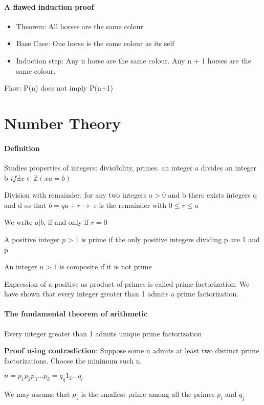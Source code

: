 \documentclass[9pt, letterpaper, oneside]{article}
\begin{document}
\paragraph{A flawed induction proof}
\begin{itemize}
	\item Theorem: All horses are the same colour
	\item Base Case: One horse is the same colour as its self
	\item Induction step: Any n horse are the same colour. Any n + 1 horses are the same colour.
\end{itemize}

Flaw: P(n) does not imply P(n+1)

\section{Number Theory}

\paragraph{Definition}
Studies properties of integers: divisibility, primes. an integer a divides an integer b $if \exists x \in \mathbb{Z} (xa=b)$


Division with remainder: for any two integers $a > 0$ and b there exists integers q and d  so that $b = qa + r \to$ r is the remainder with $0 \leq r \leq a$

We write $a | b$, if and only if $r = 0$

A positive integer $p > 1$ is prime if the only positive integers dividing p are 1 and p

An integer $n > 1$ is composite if it is not prime

Expression of a positive as product of primes is called prime factorization. We have shown that every integer greater than 1 admits a prime factorization.

\paragraph{The fundamental theorem of arithmetic} Every integer greater than 1 admits unique prime factorization

\textbf{Proof using contradiction}: Suppose some n admits at least two distinct prime factorizations. Choose the minimum such n.

$n = p_1p_2p_3...p_k = q_q1_2...q_l$

We may assume that $p_1$ is the smallest prime among all the primes $p_i$ and $q_j$
\end{document}
